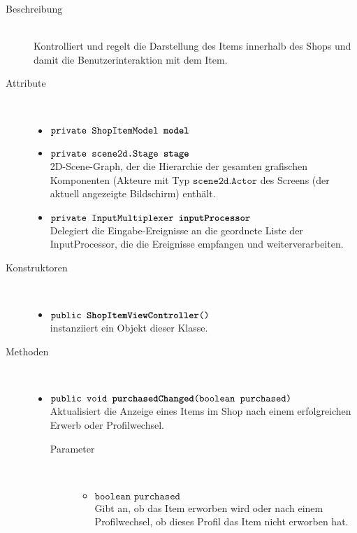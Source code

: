 \begin{description}
\item[Beschreibung] \hfill \\ Kontrolliert und regelt die Darstellung des Items innerhalb des Shops und damit die Benutzerinteraktion mit dem Item.
\item[Attribute] \hfill \\
	\vspace{-.8cm}
	\begin{itemize}	
		\item $\texttt{private ShopItemModel \textbf{model}}$ \\ 
		\item $\texttt{private scene2d.Stage \textbf{stage}}$ \\ 2D-Scene-Graph, der die Hierarchie der gesamten grafischen Komponenten (Akteure mit Typ $\texttt{scene2d.Actor}$ des Screens (der aktuell angezeigte Bildschirm) enthält. 
		\item $\texttt{private InputMultiplexer \textbf{inputProcessor}}$ \\ Delegiert die Eingabe-Ereignisse an die geordnete Liste der InputProcessor, die die Ereignisse empfangen und weiterverarbeiten.
		\end{itemize}
	
\item[Konstruktoren] \hfill \\
	\vspace{-.8cm}
	\begin{itemize}
		\item $\texttt{public \textbf{ShopItemViewController}()}$ \\ instanziiert ein Objekt dieser Klasse.

	\end{itemize}
	
\item[Methoden] \hfill \\
	\vspace{-.8cm}
	\begin{itemize}
		\item $\texttt{public void \textbf{purchasedChanged}(boolean purchased)}$ \\ Aktualisiert die Anzeige eines Items im Shop nach einem erfolgreichen Erwerb oder Profilwechsel.	
		\begin{description}
			\item[Parameter] \hfill \\
			\vspace{-.8cm}
			\begin{itemize}
				\item $\texttt{boolean purchased}$ \\ Gibt an, ob das Item erworben wird oder nach einem Profilwechsel, ob dieses Profil das Item nicht erworben hat.
			\end{itemize}
			\end{description}
		

\end{itemize}
\end{description}
